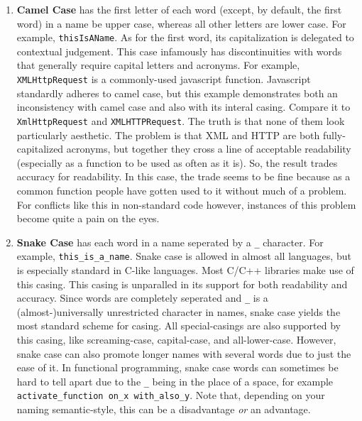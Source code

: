 \documentclass{article}
\newcommand{\code}[1]{\texttt{#1}}
\begin{document}
	\begin{enumerate}[label=\Alph*)]
		\item \textbf{Camel Case} has the first letter of each word (except, by default, the first word) in a name be upper case, whereas all other letters are lower case. For example, \code{thisIsAName}. As for the first word, its capitalization is delegated to contextual judgement. This case infamously has discontinuities with words that generally require capital letters and acronyms. For example, \code{XMLHttpRequest} is a commonly-used javascript function. Javascript standardly adheres to camel case, but this example demonstrates both an inconsistency with camel case and also with its interal casing. Compare it to \code{XmlHttpRequest} and \code{XMLHTTPRequest}. The truth is that none of them look particularly aesthetic. The problem is that XML and HTTP are both fully-capitalized acronyms, but together they cross a line of acceptable readability (especially as a function to be used as often as it is). So, the result trades accuracy for readability. In this case, the trade seems to be fine because as a common function people have gotten used to it without much of a problem. For conflicts like this in non-standard code however, instances of this problem become quite a pain on the eyes.

		\item \textbf{Snake Case} has each word in a name seperated by a \code{\_} character. For example, \code{this\_is\_a\_name}. Snake case is allowed in almost all languages, but is especially standard in C-like languages. Most C/C++ libraries make use of this casing. This casing is unparalled in its support for both readability and accuracy. Since words are completely seperated and \code{\_} is a (almost-)universally unrestricted character in names, snake case yields the most standard scheme for casing. All special-casings are also supported by this casing, like screaming-case, capital-case, and all-lower-case. However, snake case can also promote longer names with several words due to just the ease of it. In functional programming, snake case words can sometimes be hard to tell apart due to the \code{\_} being in the place of a space, for example \code{activate\_function on\_x with\_also\_y}. Note that, depending on your naming semantic-style, this can be a disadvantage \textit{or} an advantage.
		

\end{enumerate}
\end{document}
